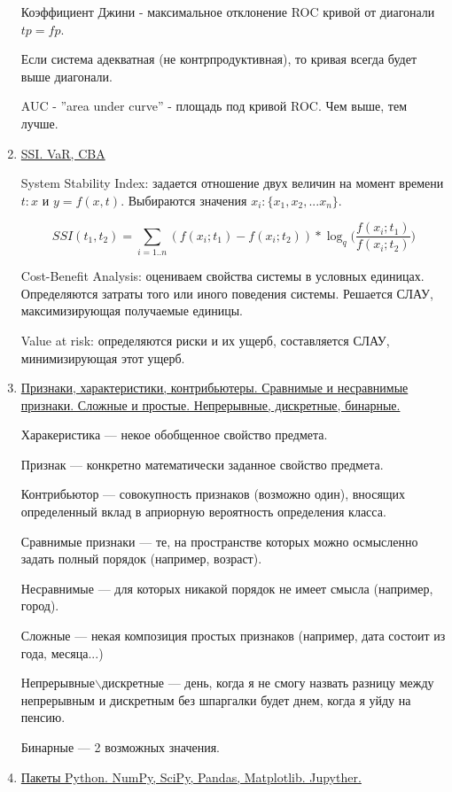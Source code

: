 \documentclass{proc}
\begin{document}
\begin{enumerate}
		Коэффициент Джини - максимальное отклонение ROC кривой от диагонали $tp = fp$.
		
		Если система адекватная (не контрпродуктивная), то кривая всегда будет выше диагонали.
		
		AUC - ''area under curve'' - площадь под кривой ROC. Чем выше, тем лучше.
		
		\item \uline{SSI. VaR, CBA}
		
		System Stability Index: задается отношение двух величин на момент времени $t:x$ и $y=f(x,t)$. Выбираются значения $x_i: \{x_1, x_2, ... x_n\}.$
		
		$$ SSI(t_1,t_2) = \sum_{i=1..n}^{} (f(x_i;t_1)-f(x_i;t_2)) * \log_q \Big(\frac{f(x_i;t_1)}{f(x_i;t_2)}\Big)$$
		
		Cost-Benefit Analysis: оцениваем свойства системы в условных единицах. Определяются затраты того или иного поведения системы. Решается СЛАУ, максимизирующая получаемые единицы.
		
		Value at risk: определяются риски и их ущерб, составляется СЛАУ, минимизирующая этот ущерб.
		
		\item \uline{Признаки, характеристики, контрибьютеры. Сравнимые и несравнимые признаки. Сложные и простые. Непрерывные, дискретные, бинарные.}
		
		Харакеристика --- некое обобщенное свойство предмета.
		
		Признак --- конкретно математически заданное свойство предмета.
		
		Контрибьютор --- совокупность признаков (возможно один), вносящих определенный вклад в априорную вероятность определения класса.
		
		Сравнимые признаки --- те, на пространстве которых можно осмысленно задать полный порядок (например, возраст).
		
		Несравнимые --- для которых никакой порядок не имеет смысла (например, город).
		
		Сложные --- некая композиция простых признаков (например, дата состоит из года, месяца...)
		
		Непрерывные$\backslash$дискретные --- день, когда я не смогу назвать разницу между непрерывным и дискретным без шпаргалки будет днем, когда я уйду на пенсию.
		
		Бинарные --- 2 возможных значения.
		
		\item \uline{Пакеты Python. NumPy, SciPy, Pandas, Matplotlib. Jupyther.}
		

\end{enumerate}
\end{document}
